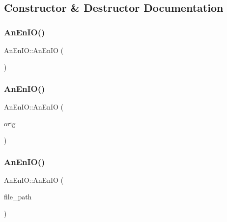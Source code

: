 \subsection{Constructor \& Destructor Documentation}
\mbox{\label{class_an_en_i_o_a199f4cd2569599820126ae27ec25a647}} 
\subsubsection{\texorpdfstring{An\+En\+I\+O()}{AnEnIO()}\hspace{0.1cm}{\footnotesize\ttfamily [1/6]}}
{\footnotesize\ttfamily An\+En\+I\+O\+::\+An\+En\+IO (\begin{DoxyParamCaption}{ }\end{DoxyParamCaption})\hspace{0.3cm}{\ttfamily [delete]}}

\mbox{\label{class_an_en_i_o_ab3dc8be2a5d7034cccd35ed72ee41275}} 
\subsubsection{\texorpdfstring{An\+En\+I\+O()}{AnEnIO()}\hspace{0.1cm}{\footnotesize\ttfamily [2/6]}}
{\footnotesize\ttfamily An\+En\+I\+O\+::\+An\+En\+IO (\begin{DoxyParamCaption}\item[{const \mbox{\hyperlink{class_an_en_i_o}{An\+En\+IO}} \&}]{orig }\end{DoxyParamCaption})\hspace{0.3cm}{\ttfamily [delete]}}

\mbox{\label{class_an_en_i_o_ad4b50b97a671e5063e08aa463e393a23}} 
\subsubsection{\texorpdfstring{An\+En\+I\+O()}{AnEnIO()}\hspace{0.1cm}{\footnotesize\ttfamily [3/6]}}
{\footnotesize\ttfamily An\+En\+I\+O\+::\+An\+En\+IO (\begin{DoxyParamCaption}\item[{std\+::string}]{file\+\_\+path }\end{DoxyParamCaption})}

